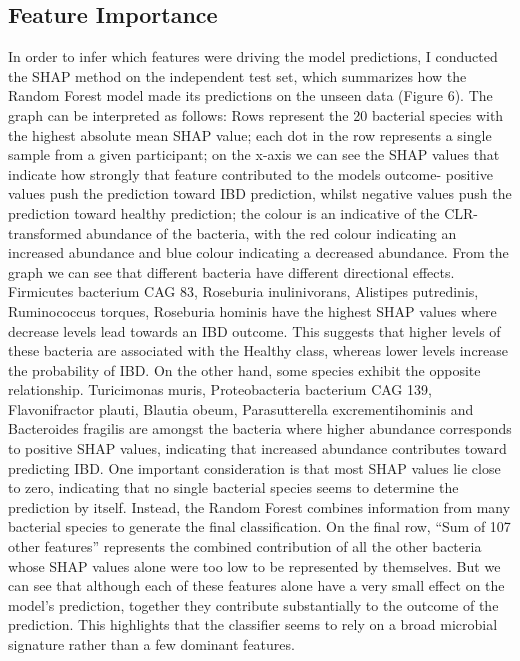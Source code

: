 \documentclass[twoside,twocolumn,10pt]{article}
\begin{document}
\subsection{Feature Importance}
In order to infer which features were driving the model predictions, I conducted the SHAP method on the independent test set, which summarizes how the Random Forest model made its predictions on the unseen data (Figure 6). The graph can be interpreted as follows: Rows represent the 20 bacterial species with the highest absolute mean SHAP value; each dot in the row represents a single sample from a given participant; on the x-axis we can see the SHAP values that indicate how strongly that feature contributed to the models outcome- positive values push the prediction toward IBD prediction, whilst negative values push the prediction toward healthy prediction; the colour is an indicative of the CLR-transformed abundance of the bacteria, with the red colour indicating an increased abundance and blue colour indicating a decreased abundance.
From the graph we can see that different bacteria have different directional effects. Firmicutes bacterium CAG 83, Roseburia inulinivorans, Alistipes putredinis, Ruminococcus torques, Roseburia hominis have the highest SHAP values where decrease levels lead towards an IBD outcome. This suggests that higher levels of these bacteria are associated with the Healthy class, whereas lower levels increase the probability of IBD. On the other hand, some species exhibit the opposite relationship. Turicimonas muris, Proteobacteria bacterium CAG 139, Flavonifractor plauti, Blautia obeum, Parasutterella excrementihominis and Bacteroides fragilis are amongst the bacteria where higher abundance corresponds to positive SHAP values, indicating that increased abundance contributes toward predicting IBD. One important consideration is that most SHAP values lie close to zero, indicating that no single bacterial species seems to determine the prediction by itself. Instead, the Random Forest combines information from many bacterial species to generate the final classification. On the final row, “Sum of 107 other features” represents the combined contribution of all the other bacteria whose SHAP values alone were too low to be represented by themselves. But we can see that although each of these features alone have a very small effect on the model’s prediction, together they contribute substantially to the outcome of the prediction. This highlights that the classifier seems to rely on a broad microbial signature rather than a few dominant features.
\end{document}
